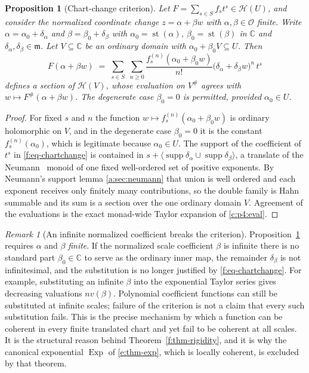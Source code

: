 \documentclass[11pt,a4paper]{article}
\numberwithin{equation}{section}
\newtheorem{proposition}[theorem]{Proposition}
\theoremstyle{definition}
\theoremstyle{remark}
\newtheorem{remark}[theorem]{Remark}
\theoremstyle{plain}
\newcommand{\CC}{\mathbb C}
\newcommand{\Ov}{\mathcal O}
\newcommand{\mm}{\mathfrak m}
\DeclareMathOperator{\supp}{supp}
\DeclareMathOperator{\st}{st}
\DeclareMathOperator{\Exp}{Exp}
\newcommand{\halo}[1]{#1^{\#}}
\newcommand{\ev}[1]{#1^{\#}}
\newcommand{\Hc}{\mathcal H}
\newcommand{\Neu}[1]{\langle #1\rangle}
\begin{document}
\begin{proposition}[Chart-change criterion]\label{f:prop-chartchange}
Let $F=\sum_{s\in S}f_{s}t^{s}\in\Hc(U)$, and consider the normalized
coordinate change $z=\alpha+\beta w$ with $\alpha,\beta\in\Ov$
\emph{finite}.  Write
$\alpha=\alpha_{0}+\delta_{\alpha}$ and
$\beta=\beta_{0}+\delta_{\beta}$ with
$\alpha_{0}=\st(\alpha)$, $\beta_{0}=\st(\beta)$ in $\CC$ and
$\delta_{\alpha},\delta_{\beta}\in\mm$.  Let $V\subseteq\CC$ be an
ordinary domain with $\alpha_{0}+\beta_{0}V\subseteq U$.  Then
\begin{equation}\label{f:eq-chartchange}
 F(\alpha+\beta w)\;=\;
 \sum_{s\in S}\;\sum_{n\ge0}
 \frac{f_{s}^{(n)}(\alpha_{0}+\beta_{0}w)}{n!}
 \bigl(\delta_{\alpha}+\delta_{\beta}w\bigr)^{n}\,t^{s}
\end{equation}
defines a section of $\Hc(V)$, whose evaluation on $\halo V$ agrees with
$w\mapsto \ev F(\alpha+\beta w)$.  The degenerate case
$\beta_{0}=0$ is permitted, provided $\alpha_{0}\in U$.
\end{proposition}

\begin{proof}
For fixed $s$ and $n$ the function
$w\mapsto f_{s}^{(n)}(\alpha_{0}+\beta_{0}w)$ is ordinary holomorphic on
$V$, and in the degenerate case $\beta_{0}=0$ it is the constant
$f_{s}^{(n)}(\alpha_{0})$, which is legitimate because
$\alpha_{0}\in U$.  The support of the coefficient of $t^{s}$ in
\eqref{f:eq-chartchange} is contained in
$s+\Neu{\supp\delta_{\alpha}\cup\supp\delta_{\beta}}$, a translate of
the Neumann~\cite{Neumann} monoid of one fixed well-ordered set of positive exponents.
By Neumann's support lemma \ref{a:sec:neumann} that union is well
ordered and each exponent receives only finitely many contributions, so
the double family is Hahn summable and its sum is a section over the one
ordinary domain $V$.  Agreement of the evaluations is the exact
monad-wide Taylor expansion of \ref{c:p4:eval}.
\end{proof}

\begin{remark}[An infinite normalized coefficient breaks the
criterion]\label{f:rem-infinitebeta}
Proposition~\ref{f:prop-chartchange} requires $\alpha$ and $\beta$
\emph{finite}.  If the normalized scale coefficient $\beta$ is infinite
there is no standard part $\beta_{0}\in\CC$ to serve as the ordinary
inner map, the remainder $\delta_{\beta}$ is not infinitesimal, and the
substitution is no longer justified by \eqref{f:eq-chartchange}.
For example, substituting an infinite $\beta$ into the exponential
Taylor series gives decreasing valuations $n v(\beta)$. Polynomial
coefficient functions can still be substituted at infinite scales;
failure of the criterion is not a claim that every such substitution fails.  This is the
precise mechanism by which a function can be coherent in every finite
translated chart and yet fail to be coherent at all scales.  It is the
structural reason behind Theorem~\ref{f:thm-rigidity}, and it is why the
canonical exponential $\Exp$ of \ref{e:thm-exp}, which is locally
coherent, is excluded by that theorem.
\end{remark}
\end{document}
